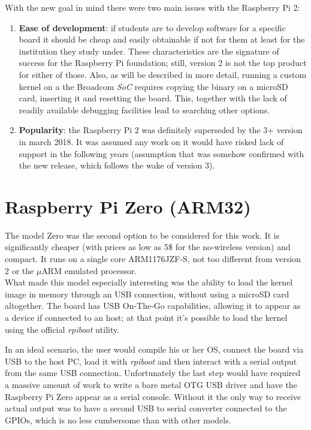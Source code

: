 \documentclass[12pt,a4paper,openright,twoside]{report}
\begin{document}
With the new goal in mind there were two main issues with the Raspberry Pi 2:
\begin{enumerate}
    \item \textbf{Ease of development}: if students are to develop software
            for a specific board it should be cheap and easily obtainable if 
            not for them at least for the institution they study under.
            These characteristics are the signature of success for the Raspberry Pi
            foundation; still, version 2 is not the top product for either of
            those.
            Also, as will be described in more detail, running a custom kernel 
            on a the Broadcom \textit{SoC} requires copying the binary on a 
            microSD card, inserting it and resetting the board. This, together
            with the lack of readily available debugging facilities lead to searching
            other options.
    \item \textbf{Popularity}: the Raspberry Pi 2 was definitely superseded by the
            3+ version in march 2018. It was assumed any work on it would have
            risked lack of support in the following years (assumption that was
            somehow confirmed with the new release, which follows the wake of 
             version 3).
\end{enumerate}


\section{Raspberry Pi Zero (ARM32)}
The model Zero was the second option to be considered for this work. It is 
significantly cheaper (with prices as low as 5\$ for the no-wireless version)
and compact. It runs on a single core ARM1176JZF-S, not too different from
version 2 or the $\mu$ARM emulated processor.\\
What made this model especially interesting was the ability to load the kernel
image in memory through an USB connection, without using a microSD card altogether.
The board has USB On-The-Go capabilities, allowing it to appear as a device if connected
to an host; at that point it's possible to load the kernel using the official
 \textit{rpiboot} utility.

In an ideal scenario, the user would compile his or her OS, connect the board
via USB to the host PC, load it with \textit{rpiboot} and then interact with a
serial output from the same USB connection.
Unfortunately the last step would have required a massive amount of work to write
a bare metal OTG USB driver and have the Raspberry Pi Zero appear as a serial 
console. Without it the only way to receive actual output was to have a second
USB to serial converter connected to the GPIOs, which is no less cumbersome than
with other models.
\end{document}
